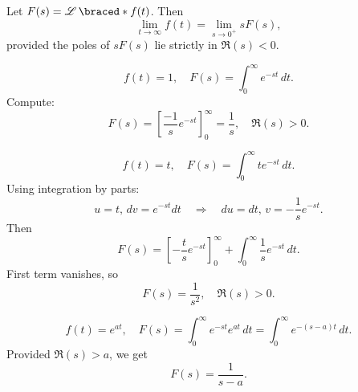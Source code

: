   \begin{theorem}
    Let $F(s) = \laplace\braced*{f(t)}$. Then
    \[
    \lim_{t \to \infty} f(t) = \lim_{s \to 0^+} sF(s),
    \]
    provided the poles of $sF(s)$ lie strictly in $\Re(s)<0$.
  \end{theorem}


  \begin{example}
    \[
    f(t) = 1, \quad F(s) = \int_0^\infty e^{-st} \,dt.
    \]
    Compute:
    \[
    F(s) = \left[ \frac{-1}{s} e^{-st} \right]_0^\infty = \frac{1}{s}, \quad \Re(s) > 0.
    \]
  \end{example}

  \begin{example}[Transform of $t$]
    \[
    f(t) = t, \quad F(s) = \int_0^\infty t e^{-st} \,dt.
    \]
    Using integration by parts:
    \[
    u = t, \, dv = e^{-st}dt \quad \Rightarrow \quad du = dt, \, v = -\frac{1}{s} e^{-st}.
    \]
    Then
    \[
    F(s) = \left[-\frac{t}{s} e^{-st}\right]_0^\infty + \int_0^\infty \frac{1}{s} e^{-st}\,dt.
    \]
    First term vanishes, so
    \[
    F(s) = \frac{1}{s^2}, \quad \Re(s) > 0.
    \]
  \end{example}

  \begin{example}[Transform of $e^{at}$]
    \[
    f(t) = e^{at}, \quad F(s) = \int_0^\infty e^{-st} e^{at}\,dt = \int_0^\infty e^{-(s-a)t}\,dt.
    \]
    Provided $\Re(s) > a$, we get
    \[
    F(s) = \frac{1}{s-a}.
    \]
  \end{example}


  \begin{marginfigure}
      
  \end{marginfigure}



